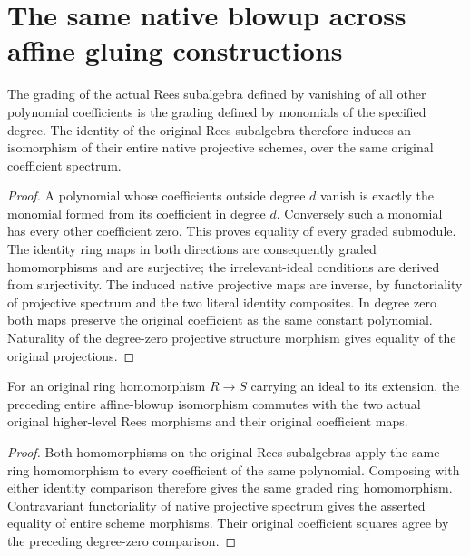 \section{The same native blowup across affine gluing constructions}

\begin{lemma}
\label{lem:fc-hironaka-dejong-affine-rees-comparison}
\leanok
{}
The grading of the actual Rees subalgebra defined by vanishing of all
other polynomial coefficients is the grading defined by monomials of
the specified degree.  The identity of the original Rees subalgebra
therefore induces an isomorphism of their entire native projective
schemes, over the same original coefficient spectrum.
\end{lemma}
\begin{proof}
A polynomial whose coefficients outside degree $d$ vanish is exactly
the monomial formed from its coefficient in degree $d$.  Conversely
such a monomial has every other coefficient zero.  This proves
equality of every graded submodule.  The identity ring maps in both
directions are consequently graded homomorphisms and are surjective;
the irrelevant-ideal conditions are derived from surjectivity.  The
induced native projective maps are inverse, by functoriality of
projective spectrum and the two literal identity composites.  In
degree zero both maps preserve the original coefficient as the same
constant polynomial.  Naturality of the degree-zero projective
structure morphism gives equality of the original projections.
\end{proof}

\begin{lemma}
\label{lem:fc-hironaka-dejong-rees-restriction}
\leanok
{}
For an original ring homomorphism $R\to S$ carrying an ideal to its
extension, the preceding entire affine-blowup isomorphism commutes
with the two actual original higher-level Rees morphisms and their
original coefficient maps.
\end{lemma}
\begin{proof}
Both homomorphisms on the original Rees subalgebras apply the same
ring homomorphism to every coefficient of the same polynomial.
Composing with either identity comparison therefore gives the same
graded ring homomorphism.  Contravariant functoriality of native
projective spectrum gives the asserted equality of entire scheme
morphisms.  Their original coefficient squares agree by the
preceding degree-zero comparison.
\end{proof}

